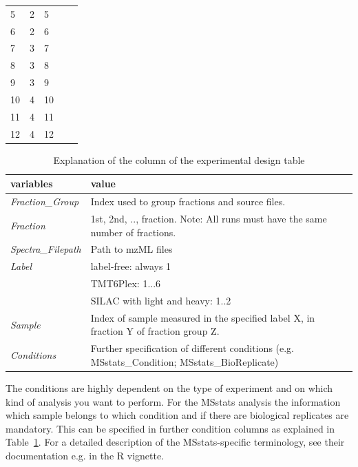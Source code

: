 \begin{table}[!ht]
\begin{tabular}{lllll}
5               & 2                  & 5                     &       &        \\
6               & 2                  & 6                     &       &        \\
7               & 3                  & 7                     &       &        \\
8               & 3                  & 8                     &       &        \\
9               & 3                  & 9                     &       &        \\
10              & 4                  & 10                    &       &        \\
11              & 4                  & 11                    &       &        \\
12              & 4                  & 12                    &       &       
\end{tabular}
\end{table}

\begin{table}[!ht]
\centering
\small
\caption{Explanation of the column of the experimental design table}
\label{t:Experimental_design_exp}
\begin{tabularx}{\textwidth}{lX}
\toprule
\textbf{variables} & \textbf{value} \\ 
\midrule
\textit{Fraction\_Group} &  Index used to group fractions and source files.  \\
\textit{Fraction} & 1st, 2nd, .., fraction. Note: All runs must have the same number of fractions. \\
\textit{Spectra\_Filepath} & Path to mzML files \\
\textit{Label} & label-free: always 1 \\
\textit{} & TMT6Plex: 1...6 \\
\textit{} & SILAC with light and heavy: 1..2 \\
\textit{Sample} & Index of sample measured in the specified label X, in fraction Y of fraction group Z. \\
\textit{Conditions} & Further specification of different conditions (e.g. MSstats\_Condition; MSstats\_BioReplicate) \\
\bottomrule
\end{tabularx}
\end{table}


\noindent The conditions are highly dependent on the type of experiment and on which kind of analysis you want to perform. For the MSstats analysis the information which sample belongs to which condition and if there are biological replicates are mandatory. This can be specified in further condition columns as explained in Table~\ref{t:Experimental_design_exp}. For a detailed description of the MSstats-specific terminology, see their documentation e.g. in the R vignette.

